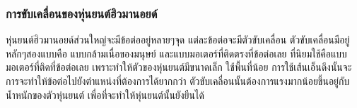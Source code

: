 \subsubsection*{การขับเคลื่อนของหุ่นยนต์ฮิวมานอยด์}
หุ่นยนต์ฮิวมานอยด์ส่วนใหญ่จะมีข้อต่ออยู่หลายๆจุด แต่ละข้อต่อจะมีตัวขับเคลื่อน ตัวขับเคลื่อนมีอยู่หลักๆสองแบบคือ
แบบกล้ามเนื่อของมนุษย์ และแบบมอเตอร์ที่ติดตรงที่ข้อต่อเลย ที่นิยมใช้คือแบบมอเตอร์ที่ติดที่ข้อต่อเลย เพราะทำให้ตัวของหุ่นยนต์มีขนาดเล็ก
ใช้พื้นที่น้อย การใช้เส้นเอ็นดึงนั้นจะการจะทำให้ข้อต่อไปยังตำแหน่งที่ต้องการได้ยากกว่า ตัวขับเคลื่อนนั้นต้องการแรงมากน้อยขึ้นอยู่กับ
น้ำหนักของตัวหุ่นยนต์ เพื่อที่จะทำให้หุ่นยนต์นั้นยังยืนได้
